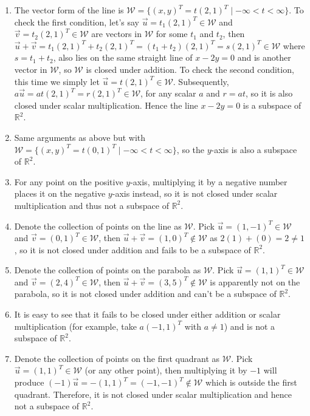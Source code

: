 \begin{solution}
\begin{enumerate}[label=(\alph*)]
\item The vector form of the line is $\mathcal{W} = \{(x,y)^T = t(2,1)^T \mid -\infty < t < \infty\}$. To check the first condition, let's say $\vec{u} = t_1(2,1)^T \in \mathcal{W}$ and $\vec{v} = t_2(2,1)^T \in \mathcal{W}$ are vectors in $\mathcal{W}$ for some $t_1$ and $t_2$, then $\vec{u} + \vec{v} = t_1(2,1)^T + t_2(2,1)^T = (t_1 + t_2)(2,1)^T = s(2,1)^T \in \mathcal{W}$ where $s = t_1 + t_2$, also lies on the same straight line of $x-2y = 0$ and is another vector in $\mathcal{W}$, so $\mathcal{W}$ is closed under addition. To check the second condition, this time we simply let $\vec{u} = t(2,1)^T \in \mathcal{W}$. Subsequently, $a\vec{u} = at(2,1)^T = r(2,1)^T \in \mathcal{W}$, for any scalar $a$ and $r = at$, so it is also closed under scalar multiplication. Hence the line $x-2y = 0$ is a subspace of $\mathbb{R}^2$.
\item Same arguments as above but with $\mathcal{W} = \{(x,y)^T = t(0,1)^T \mid -\infty < t < \infty\}$, so the $y$-axis is also a subspace of $\mathbb{R}^2$.
\item For any point on the positive $y$-axis, multiplying it by a negative number places it on the negative $y$-axis instead, so it is not closed under scalar multiplication and thus not a subspace of $\mathbb{R}^2$. 
\item Denote the collection of points on the line as $\mathcal{W}$. Pick $\vec{u} = (1, -1)^T \in \mathcal{W}$ and $\vec{v} = (0, 1)^T \in \mathcal{W}$, then $\vec{u} + \vec{v} = (1, 0)^T \notin \mathcal{W}$ as $2(1) + (0) = 2 \neq 1$, so it is not closed under addition and fails to be a subspace of $\mathbb{R}^2$.
\item Denote the collection of points on the parabola as $\mathcal{W}$. Pick $\vec{u} = (1,1)^T \in \mathcal{W}$ and $\vec{v} = (2,4)^T \in \mathcal{W}$, then $\vec{u} + \vec{v} = (3,5)^T \notin \mathcal{W}$ is apparently not on the parabola, so it is not closed under addition and can't be a subspace of $\mathbb{R}^2$.
\item It is easy to see that it fails to be closed under either addition or scalar multiplication (for example, take $a(-1,1)^T$ with $a\neq 1$) and is not a subspace of $\mathbb{R}^2$.
\item Denote the collection of points on the first quadrant as $\mathcal{W}$. Pick $\vec{u} = (1,1)^T \in \mathcal{W}$ (or any other point), then multiplying it by $-1$ will produce $(-1)\vec{u} = -(1,1)^T = (-1,-1)^T \notin \mathcal{W}$ which is outside the first quadrant. Therefore, it is not closed under scalar multiplication and hence not a subspace of $\mathbb{R}^2$.

\end{enumerate}
\end{solution}
